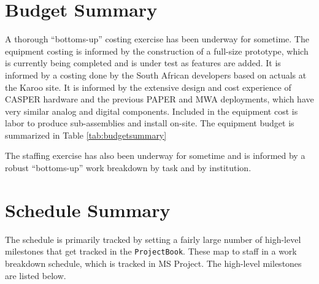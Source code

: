 \documentclass[preprint]{aastex}
\begin{document}
\section{Budget Summary}
\label{sec:budget}
A thorough ``bottoms-up'' costing exercise has been underway for sometime. The equipment
costing is informed by the construction of a full-size prototype, which is currently
being completed and is under test as features are added. It is informed by a costing
done by the South African developers based on actuals at the Karoo site. It is
informed by the extensive design and cost experience of CASPER hardware and the
previous PAPER and MWA deployments, which have very similar analog and digital components.
Included in the equipment cost is labor to produce sub-assemblies and install on-site.
The equipment budget is summarized in Table \ref{tab:budgetsummary}


The staffing exercise has also been underway for sometime and is informed by a robust
``bottoms-up'' work breakdown by task and by institution.



\section{Schedule Summary}
\label{sec:schedule}
The schedule is primarily tracked by setting a fairly large number of high-level
milestones that get tracked in the {\tt ProjectBook}. These map to staff in a work
breakdown schedule, which is tracked in MS Project. The high-level milestones are
listed below.
\end{document}
